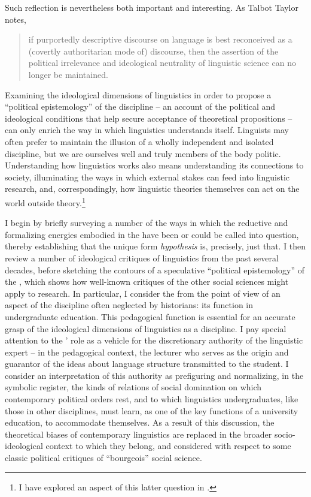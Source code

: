 \documentclass[output=paper]{langscibook}
\begin{document}
Such reflection is nevertheless both important and interesting. As Talbot Taylor notes, 

\begin{quotation}
if purportedly descriptive discourse on language is best reconceived as a (covertly authoritarian mode of)  discourse, then the assertion of the political irrelevance and ideological neutrality of linguistic science can no longer be maintained. \citep[25]{Taylor1990}
\end{quotation}

\noindent Examining the ideological dimensions of linguistics in order to propose a ``political epistemology'' of the discipline -- an account of the political and ideological conditions that help secure acceptance of theoretical propositions -- can only enrich the way in which linguistics understands itself. Linguists may often prefer to maintain the illusion of a wholly independent and isolated discipline, but we are ourselves well and truly members of the body politic. Understanding how linguistics works also means understanding its connections to society, illuminating the ways in which external stakes can feed into linguistic research, and, correspondingly, how linguistic theories themselves can act on the world outside theory.\footnote{I have explored an aspect of this latter question in \citet{Riemer2019}.}

I begin by briefly surveying a number of the ways in which the reductive and formalizing energies embodied in the  have been or could be called into question, thereby establishing that the unique form \emph{hypothesis} is, precisely, just that. I then review a number of ideological critiques of linguistics from the past several decades, before sketching the contours of a speculative ``political epistemology'' of the , which shows how well-known critiques of the other social sciences might apply to  research. In particular, I consider the  from the point of view of an aspect of the discipline often neglected by historians: its function in undergraduate education. This pedagogical function is essential for an accurate grasp of the ideological dimensions of linguistics as a discipline. I pay special attention to the ' role as a vehicle for the discretionary authority of the linguistic expert -- in the pedagogical context, the lecturer who serves as the origin and guarantor of the ideas about language structure transmitted to the student. I consider an interpretation of this authority as prefiguring and normalizing, in the symbolic register, the kinds of relations of social domination on which contemporary political orders rest, and to which linguistics undergraduates, like those in other disciplines, must learn, as one of the key functions of a university education, to accommodate themselves. As a result of this discussion, the theoretical biases of contemporary linguistics are replaced in the broader socio-ideological context to which they belong, and considered with respect to some classic political critiques of ``bourgeois'' social science.
\end{document}
